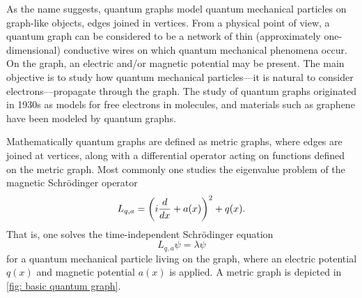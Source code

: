 
As the name suggests, quantum graphs model quantum mechanical particles on graph-like objects, edges joined in vertices. From a physical point of view, a quantum graph can be considered to be a network of thin (approximately one-dimensional) conductive wires on which quantum mechanical phenomena occur. On the graph, an electric and/or magnetic potential may be present. The main objective is to study how quantum mechanical particles---it is natural to consider electrons---propagate through the graph. The study of quantum graphs originated in 1930s as models for free electrons in molecules, and materials such as graphene have been modeled by quantum graphs.



Mathematically quantum graphs are defined as metric graphs, where edges are joined at vertices, along with a differential operator acting on functions defined on the metric graph. Most commonly one studies the eigenvalue problem of the magnetic Schrödinger operator
\[
  L_{q,a} = \left(i\frac{d}{dx}+a(x)\right)^2+q(x).
\]
That is, one solves the time-independent Schrödinger equation
\[
  L_{q,a} \psi = \lambda \psi
\]
for a quantum mechanical particle living on the graph, where an electric potential $q(x)$ and magnetic potential $a(x)$ is applied. A metric graph is depicted in \cref{fig: basic quantum graph}.

